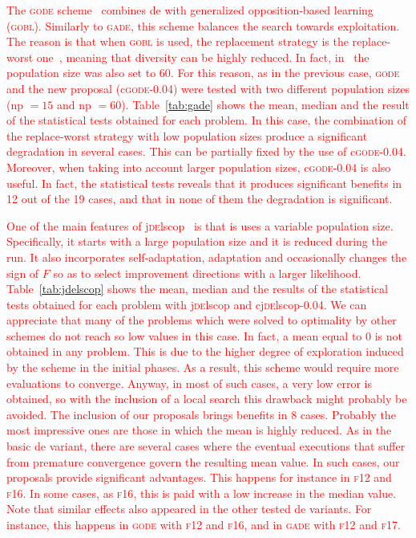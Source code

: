 \documentclass[review,3p]{elsarticle}
\newcommand{\DE}{{\sc de}}
\newcommand{\NP}{{\sc np}}
\begin{document}


\textcolor{red}{
The \textsc{gode} scheme~\cite{Wang:11b} combines \DE{} with generalized opposition-based learning (\textsc{gobl}).
%
Similarly to \textsc{gade}, this scheme balances the search towards exploitation.
%
The reason is that when \textsc{gobl} is used, the replacement strategy is the replace-worst one~\cite{Eiben:03}, meaning that diversity can be highly reduced.
%
In fact, in~\cite{Wang:11b} the population size was also set to 60.
%
For this reason, as in the previous case, \textsc{gode} and the new proposal (c\textsc{gode-0.04}) were tested
with two different population sizes (\NP{} $= 15$ and \NP{} $= 60$).
%
Table~\ref{tab:gade} shows the mean, median and the result of the statistical tests obtained for each problem.
%
In this case, the combination of the replace-worst strategy with low population sizes produce a significant degradation in several cases.
%
This can be partially fixed by the use of c\textsc{gode-0.04}.
%
Moreover, when taking into account larger population sizes, c\textsc{gode-0.04} is also useful.
%
In fact, the statistical tests reveals that it produces significant benefits in 12 out of the 19 cases, and that in none
of them the degradation is significant.
}



\textcolor{red}{
One of the main features of j\textsc{de}lscop~\cite{Brest:11} is that is uses a variable population size.
%
Specifically, it starts with a large population size and it is reduced during the run.
%
It also incorporates self-adaptation, adaptation and occasionally changes the sign of $F$ so as to select improvement directions with a larger
likelihood.
%
Table~\ref{tab:jdelscop} shows the mean, median and the results of the statistical tests obtained for each problem with j\textsc{de}lscop and cj\textsc{de}lscop-0.04.
%
We can appreciate that many of the problems which were solved to optimality by other schemes do not reach so low values in this case.
%
In fact, a mean equal to 0 is not obtained in any problem.
%
This is due to the higher degree of exploration induced by the scheme in the initial phases.
%
As a result, this scheme would require more evaluations to converge.
%
Anyway, in most of such cases, a very low error is obtained, so with the inclusion of a local search this drawback might probably be avoided.
%
The inclusion of our proposals brings benefits in 8 cases.
%
Probably the most impressive ones are those in which the mean is highly reduced.
%
As in the basic \DE{} variant, there are several cases where the eventual executions that suffer from premature convergence 
govern the resulting mean value.
%
In such cases, our proposals provide significant advantages.
%
This happens for instance in \textsc{f12} and \textsc{f16}.
%
In some cases, as \textsc{f16}, this is paid with a low increase in the median value.
%
Note that similar effects also appeared in the other tested \DE{} variants.
%
For instance, this happens in \textsc{gode} with \textsc{f12} and \textsc{f16}, and in \textsc{gade} with \textsc{f12} and \textsc{f17}.
}
\end{document}
